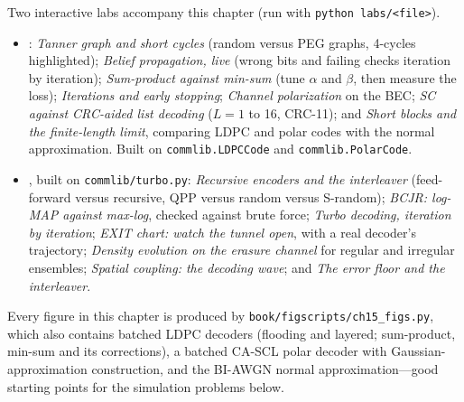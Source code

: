 \begin{labbox}
\raggedright
Two interactive labs accompany this chapter (run with \texttt{python labs/<file>}).
\begin{itemize}
\item {}: \emph{Tanner graph and short cycles} (random
versus PEG graphs, 4-cycles highlighted); \emph{Belief propagation, live} (wrong bits and failing
checks iteration by iteration); \emph{Sum-product against min-sum} (tune $\alpha$ and $\beta$, then
measure the loss); \emph{Iterations and early stopping}; \emph{Channel polarization} on the BEC;
\emph{SC against CRC-aided list decoding} ($L=1$ to 16, CRC-11); and \emph{Short blocks and the
finite-length limit}, comparing LDPC and polar codes with the normal approximation. Built on
\texttt{commlib.LDPCCode} and \texttt{commlib.PolarCode}.
\item {}, built on \texttt{commlib/turbo.py}:
\emph{Recursive encoders and the interleaver} (feed-forward versus recursive, QPP versus random
versus S-random); \emph{BCJR: log-MAP against max-log}, checked against brute force; \emph{Turbo
decoding, iteration by iteration}; \emph{EXIT chart: watch the tunnel open}, with a real decoder's
trajectory; \emph{Density evolution on the erasure channel} for regular and irregular ensembles;
\emph{Spatial coupling: the decoding wave}; and \emph{The error floor and the interleaver}.
\end{itemize}
Every figure in this chapter is produced by \texttt{book/figscripts/ch15\_figs.py}, which also
contains batched LDPC decoders (flooding and layered; sum-product, min-sum and its corrections), a
batched CA-SCL polar decoder with Gaussian-approximation construction, and the BI-AWGN normal
approximation---good starting points for the simulation problems below.
\end{labbox}

